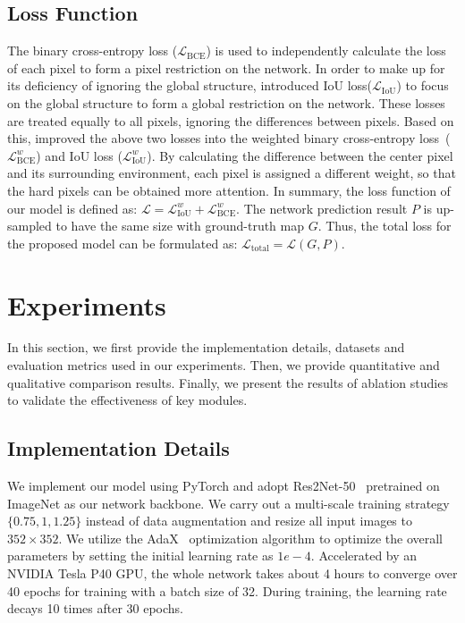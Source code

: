 \documentclass{article}
\begin{document}
\subsection{Loss Function}
The binary cross-entropy loss ($\mathcal{L}_\text{BCE}$) is used to independently calculate the loss of each pixel to form a pixel restriction on the network. In order to make up for its deficiency of ignoring the global structure, \cite{basnet} introduced IoU loss($\mathcal{L}_\text{IoU}$) to focus on the global structure to form a global restriction on the network. These losses are treated equally to all pixels, ignoring the differences between pixels. Based on this, \cite{f3net} improved the above two losses into the weighted binary cross-entropy loss~($\mathcal{L}_\text{BCE}^w$) and IoU loss ($\mathcal{L}_\text{IoU}^w$). By calculating the difference between the center pixel and its surrounding environment, each pixel is assigned a different weight, so that the hard pixels can be obtained more attention. In summary, the loss function of our model is defined as: $\mathcal{L} = \mathcal{L}_\text{IoU}^w + \mathcal{L}_\text{BCE}^w$. The network prediction result $P$ is up-sampled to have the same size with ground-truth map $G$. Thus, the total loss for the proposed model can be formulated as: $\mathcal{L}_{\text{total}} = \mathcal{L} (G, P)$.

\section{Experiments}

In this section, we first provide the implementation details, datasets and evaluation metrics used in our experiments. Then, we provide quantitative and qualitative comparison results. Finally, we present the results of ablation studies to validate the effectiveness of key modules.

\subsection{Implementation Details}

We implement our model using PyTorch and adopt Res2Net-50~\cite{res2net} pretrained on ImageNet as our network backbone. We carry out a multi-scale training strategy $\{0.75, 1, 1.25\}$ instead of data augmentation and resize all input images to $352\times{352}$. We utilize the AdaX~\cite{li2020adax} optimization algorithm to optimize the overall parameters by setting the initial learning rate as $1e-4$. Accelerated by an NVIDIA Tesla P40 GPU, the whole network takes about 4 hours to converge over 40 epochs for training with a batch size of 32. During training, the learning rate decays 10 times after 30 epochs.
\end{document}
